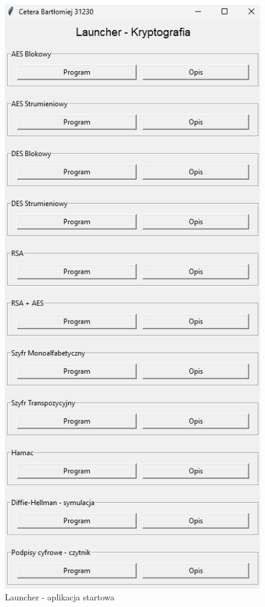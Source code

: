 \documentclass[12pt,a4paper]{article}
\begin{document}
\begin{figure}[!htb]
\begin{center}
\includegraphics[scale=0.45]{pictures/launcher.png}
\caption{Launcher - aplikacja startowa}
\label{fig:launcher_startowa}
\end{center}
\end{figure}
\end{document}
